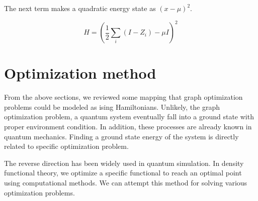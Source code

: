 The next term makes a quadratic energy state as $(x-\mu)^2$.

\begin{equation*}
    H = (\frac{1}{2}\sum_{i} (I - Z_i) - \mu I)^2
\end{equation*}


\section{Optimization method}

From the above sections, we reviewed some mapping that graph optimization problems 
could be modeled as ising Hamiltonians.
Unlikely, the graph optimization problem, a quantum system eventually fall into a ground state 
with proper environment condition. In addition, these processes are already known in quantum mechanics.
Finding a ground state energy of the system is directly related to specific optimization problem.

The reverse direction has been widely used in quantum simulation. 
In density functional theory, we optimize a specific functional to reach an optimal point
using computational methods. 
We can attempt this method for solving various optimization problems.


